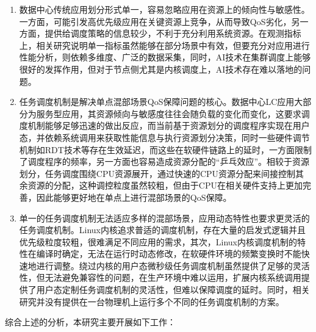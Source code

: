 \begin{enumerate}
    \item 数据中心传统应用划分形式单一，容易忽略应用在资源上的倾向性与敏感性。一方面，可能引发高优先级应用在关键资源上竞争，从而导致QoS劣化，另一方面，提供给调度策略的信息较少，不利于充分利用系统资源。在观测指标上，相关研究说明单一指标虽然能够在部分场景中有效，但要充分对应用进行性能分析，则依赖多维度、广泛的数据采集，同时，AI技术在集群调度上能够很好的发挥作用，但对于节点侧尤其是内核调度上，AI技术存在难以落地的问题。
    \item 任务调度机制是解决单点混部场景QoS保障问题的核心。数据中心LC应用大部分为服务型应用，其资源倾向与敏感度往往会随负载的变化而变化，这要求调度机制能够足够迅速的做出反应，而当前基于资源划分的调度程序实现在用户态，并依赖系统调用来获取性能信息与执行资源划分决策，同时一些硬件调节机制如RDT技术等存在生效延迟，而这些在软硬件链路上的延时，一方面限制了调度程序的频率，另一方面也容易造成资源分配的“乒乓效应”。相较于资源划分，任务调度围绕CPU资源展开，通过快速的CPU资源分配来间接控制其余资源的分配，这种调控粒度虽然较粗，但由于CPU在相关硬件支持上更加完善，因此能够更好地在单点上进行混部场景的QoS保障。
    \item 单一的任务调度机制无法适应多样的混部场景，应用动态特性也要求更灵活的任务调度机制。Linux内核追求普适的调度机制，存在大量的启发式逻辑并且优先级粒度较粗，很难满足不同应用的需求，其次，Linux内核调度机制的特性在编译时确定，无法在运行时动态修改，在软硬件环境的频繁变换时不能快速地进行调整。绕过内核的用户态微秒级任务调度机制虽然提供了足够的灵活性，但无法避免兼容性的问题，在生产环境中难以运用，扩展内核系统调用提供了用户态定制任务调度机制的灵活性，但难以保障调度的延时。同时，相关研究并没有提供在一台物理机上运行多个不同的任务调度机制的方案。
\end{enumerate}

综合上述的分析，本研究主要开展如下工作：


